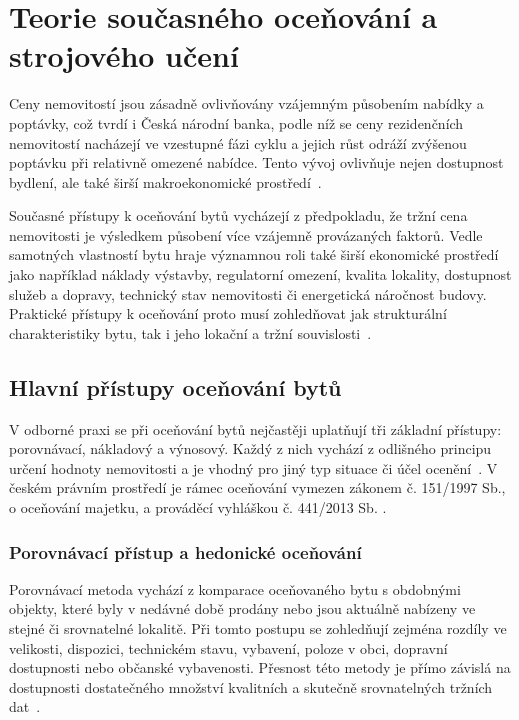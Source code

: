 \chapter{Teorie současného oceňování a strojového učení} \label{chap:market_analysis}
Ceny nemovitostí jsou zásadně ovlivňovány vzájemným působením nabídky a poptávky, což tvrdí i Česká národní banka, podle níž se ceny rezidenčních nemovitostí nacházejí ve vzestupné fázi cyklu a jejich růst odráží zvýšenou poptávku při relativně omezené nabídce. Tento vývoj ovlivňuje nejen dostupnost bydlení, ale také širší makroekonomické prostředí~\cite{CNB2024RezidencniTrh,CNB2024RealitniTrh,CNB2024ZFS}. 

Současné přístupy k oceňování bytů vycházejí z předpokladu, že tržní cena nemovitosti je výsledkem působení více vzájemně provázaných faktorů. Vedle samotných vlastností bytu hraje významnou roli také širší ekonomické prostředí jako například náklady výstavby, regulatorní omezení, kvalita lokality, dostupnost služeb a dopravy, technický stav nemovitosti či energetická náročnost budovy. Praktické přístupy k oceňování proto musí zohledňovat jak strukturální charakteristiky bytu, tak i jeho lokační a tržní souvislosti~\cite{IVSC2022,AppraisalInstitute2020}.

\section{Hlavní přístupy oceňování bytů}

V odborné praxi se při oceňování bytů nejčastěji uplatňují tři základní přístupy: porovnávací, nákladový a výnosový. Každý z nich vychází z odlišného principu určení hodnoty nemovitosti a je vhodný pro jiný typ situace či účel ocenění~\cite{IVSC2022,AppraisalInstitute2020}. V českém právním prostředí je rámec oceňování vymezen zákonem č. 151/1997 Sb., o oceňování majetku, a prováděcí vyhláškou č. 441/2013 Sb. \cite{Zakon151_1997,Vyhlaska441_2013}.

\subsection*{Porovnávací přístup a hedonické oceňování}
Porovnávací metoda vychází z komparace oceňovaného bytu s obdobnými objekty, které byly v nedávné době prodány nebo jsou aktuálně nabízeny ve stejné či srovnatelné lokalitě. Při tomto postupu se zohledňují zejména rozdíly ve velikosti, dispozici, technickém stavu, vybavení, poloze v obci, dopravní dostupnosti nebo občanské vybavenosti. Přesnost této metody je přímo závislá na dostupnosti dostatečného množství kvalitních a skutečně srovnatelných tržních dat~\cite{CNB2024RealitniTrh}.

